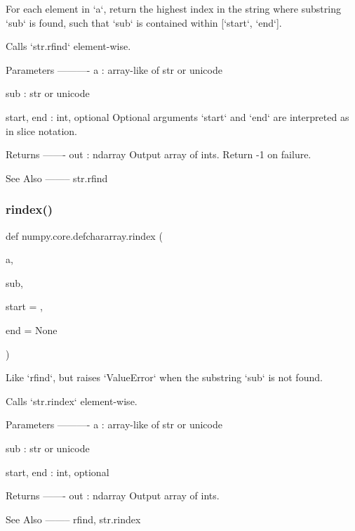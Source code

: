 \begin{DoxyVerb}For each element in `a`, return the highest index in the string
where substring `sub` is found, such that `sub` is contained
within [`start`, `end`].

Calls `str.rfind` element-wise.

Parameters
----------
a : array-like of str or unicode

sub : str or unicode

start, end : int, optional
    Optional arguments `start` and `end` are interpreted as in
    slice notation.

Returns
-------
out : ndarray
   Output array of ints.  Return -1 on failure.

See Also
--------
str.rfind\end{DoxyVerb}
 \mbox{\label{namespacenumpy_1_1core_1_1defchararray_a38613efaaf43c989ff9efcdeca853e7d}} 
\subsubsection{\texorpdfstring{rindex()}{rindex()}}
{\footnotesize\ttfamily def numpy.\+core.\+defchararray.\+rindex (\begin{DoxyParamCaption}\item[{}]{a,  }\item[{}]{sub,  }\item[{}]{start = {},  }\item[{}]{end = {\ttfamily None} }\end{DoxyParamCaption})}

\begin{DoxyVerb}Like `rfind`, but raises `ValueError` when the substring `sub` is
not found.

Calls `str.rindex` element-wise.

Parameters
----------
a : array-like of str or unicode

sub : str or unicode

start, end : int, optional

Returns
-------
out : ndarray
   Output array of ints.

See Also
--------
rfind, str.rindex\end{DoxyVerb}
 \mbox{\label{namespacenumpy_1_1core_1_1defchararray_a41e0bf72752b8abe1e6d967b788a1218}} 
